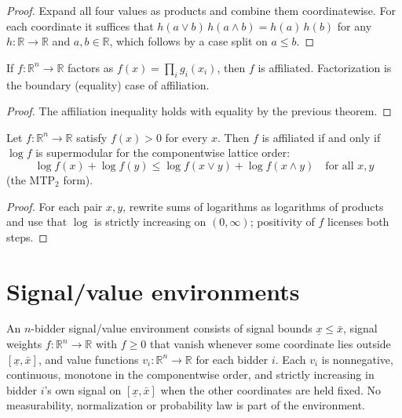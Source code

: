 \begin{proof}
\leanok
Expand all four values as products and combine them coordinatewise. For each coordinate it suffices that $h(a \vee b)\, h(a \wedge b) = h(a)\, h(b)$ for any $h : \mathbb{R} \to \mathbb{R}$ and $a, b \in \mathbb{R}$, which follows by a case split on $a \le b$.
\end{proof}

\begin{theorem}\label{thm:MathEconLib.Auction.Affiliation.factors_affiliated}
\leanok
{}
If $f : \mathbb{R}^n \to \mathbb{R}$ factors as $f(x) = \prod_i g_i(x_i)$, then $f$ is affiliated. Factorization is the boundary (equality) case of affiliation.
\end{theorem}

\begin{proof}
\leanok
{}
The affiliation inequality holds with equality by the previous theorem.
\end{proof}

\begin{theorem}\label{thm:MathEconLib.Auction.Affiliation.affiliated_iff_logSupermodular}
\leanok
{}
Let $f : \mathbb{R}^n \to \mathbb{R}$ satisfy $f(x) > 0$ for every $x$. Then $f$ is affiliated if and only if $\log f$ is supermodular for the componentwise lattice order:
\[
  \log f(x) + \log f(y) \le \log f(x \vee y) + \log f(x \wedge y) \quad \text{for all } x, y
\]
(the MTP$_2$ form).
\end{theorem}

\begin{proof}
\leanok
For each pair $x, y$, rewrite sums of logarithms as logarithms of products and use that $\log$ is strictly increasing on $(0, \infty)$; positivity of $f$ licenses both steps.
\end{proof}

\section{Signal/value environments}

\begin{definition}\label{def:MathEconLib.Auction.Affiliation.SignalValueEnv}
\leanok
An $n$-bidder signal/value environment consists of signal bounds $\underline{x} \le \bar{x}$, signal weights $f : \mathbb{R}^n \to \mathbb{R}$ with $f \ge 0$ that vanish whenever some coordinate lies outside $[\underline{x}, \bar{x}]$, and value functions $v_i : \mathbb{R}^n \to \mathbb{R}$ for each bidder $i$. Each $v_i$ is nonnegative, continuous, monotone in the componentwise order, and strictly increasing in bidder $i$'s own signal on $[\underline{x}, \bar{x}]$ when the other coordinates are held fixed. No measurability, normalization or probability law is part of the environment.
\end{definition}

